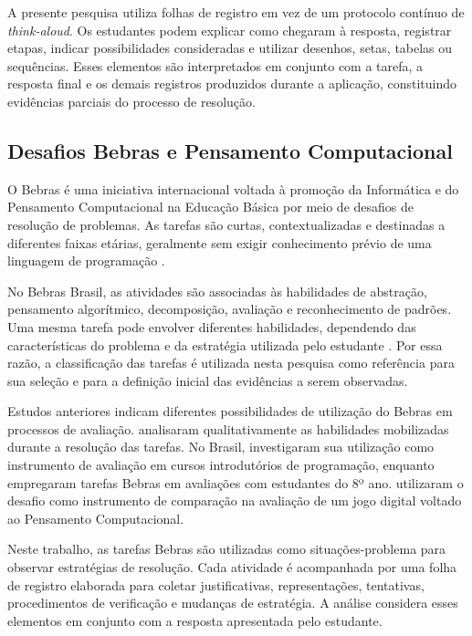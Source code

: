 A presente pesquisa utiliza folhas de registro em vez de um protocolo contínuo de \textit{think-aloud}. Os estudantes podem explicar como chegaram à resposta, registrar etapas, indicar possibilidades consideradas e utilizar desenhos, setas, tabelas ou sequências. Esses elementos são interpretados em conjunto com a tarefa, a resposta final e os demais registros produzidos durante a aplicação, constituindo evidências parciais do processo de resolução.

\subsection{Desafios Bebras e Pensamento Computacional}

O Bebras é uma iniciativa internacional voltada à promoção da Informática e do Pensamento Computacional na Educação Básica por meio de desafios de resolução de problemas. As tarefas são curtas,
contextualizadas e destinadas a diferentes faixas etárias, geralmente sem exigir conhecimento prévio de uma linguagem de programação \cite{dagiene2016}.

No Bebras Brasil, as atividades são associadas às habilidades de abstração, pensamento algorítmico, decomposição, avaliação e reconhecimento de padrões. Uma mesma tarefa pode envolver diferentes
habilidades, dependendo das características do problema e da estratégia utilizada pelo estudante \cite{bebras2026}. Por essa razão, a classificação das tarefas é utilizada nesta pesquisa como referência para sua seleção e para a definição inicial das evidências a serem observadas.

Estudos anteriores indicam diferentes possibilidades de utilização do Bebras em processos de avaliação.  analisaram qualitativamente as habilidades mobilizadas durante a resolução das tarefas. No Brasil,  investigaram sua utilização como instrumento de avaliação em cursos introdutórios de programação, enquanto  empregaram tarefas Bebras em avaliações com estudantes do 8º ano.  utilizaram o desafio como instrumento de comparação na avaliação de um jogo digital voltado ao Pensamento Computacional.

Neste trabalho, as tarefas Bebras são utilizadas como situações-problema para observar estratégias de resolução. Cada atividade é acompanhada por uma folha de registro elaborada para coletar justificativas, representações, tentativas, procedimentos de verificação e mudanças de estratégia. A análise considera esses elementos em conjunto com a resposta apresentada pelo estudante.


